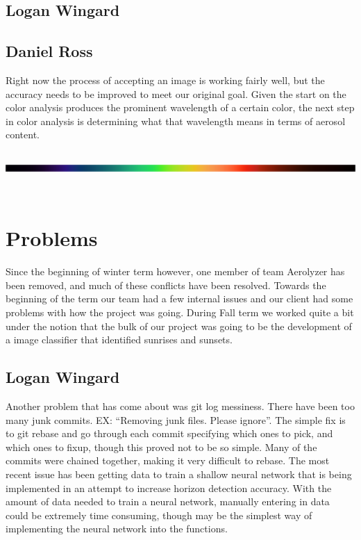 \documentclass[onecolumn, draftclsnofoot,10pt, compsoc]{IEEEtran}
\begin{document}
\begin{singlespace}
		\subsection{Logan Wingard}
			
		\subsection{Daniel Ross}
			Right now the process of accepting an image is working fairly well, but the accuracy needs to be improved to meet our original goal.
			Given the start on the color analysis produces the prominent wavelength of a certain color, the next step in color analysis is determining what that wavelength means in terms of aerosol content.
			\includegraphics[height=2cm,natwidth=370,natheight=7]{images/Visible_Color_Spectrum.png}


	\section{Problems}
		Since the beginning of winter term however, one member of team Aerolyzer has been removed, and much of these conflicts have been resolved.
		Towards the beginning of the term our team had a few internal issues and our client had some problems with how the project was going.
		During Fall term we worked quite a bit under the notion that the bulk of our project was going to be the development of a image classifier that identified sunrises and sunsets.
		\subsection{Logan Wingard}
			Another problem that has come about was git log messiness.
			There have been too many junk commits.
            EX: ``Removing junk files. Please ignore''.
			The simple fix is to git rebase and go through each commit specifying which ones to pick, and which ones to fixup, though this proved not to be so simple.
			Many of the commits were chained together, making it very difficult to rebase.
			The most recent issue has been getting data to train a shallow neural network that is being implemented in an attempt to increase horizon detection accuracy.
			With the amount of data needed to train a neural network, manually entering in data could be extremely time consuming, though may be the simplest way of implementing the neural network into the functions.

\end{singlespace}
\end{document}
